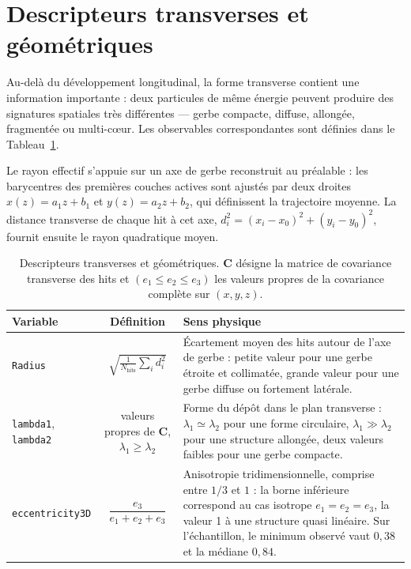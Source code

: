 \section{Descripteurs transverses et géométriques}
\label{annexe:transverse}

Au-delà du développement longitudinal, la forme transverse contient une information importante : deux particules de même énergie peuvent produire des signatures spatiales très différentes — gerbe compacte, diffuse, allongée, fragmentée ou multi-cœur. Les observables correspondantes sont définies dans le Tableau~\ref{tab:annexeA-transverse}.

Le rayon effectif s'appuie sur un axe de gerbe reconstruit au préalable : les barycentres des premières couches actives sont ajustés par deux droites \(x(z)=a_1 z+b_1\) et \(y(z)=a_2 z+b_2\), qui définissent la trajectoire moyenne. La distance transverse de chaque hit à cet axe, \(d_i^2=(x_i-x_0)^2+(y_i-y_0)^2\), fournit ensuite le rayon quadratique moyen.

\begin{table}[!ht]
    \centering
    \caption{Descripteurs transverses et géométriques. \(\mathbf{C}\) désigne la matrice de
             covariance transverse des hits et \((e_1 \le e_2 \le e_3)\) les valeurs propres de la
             covariance complète sur \((x,y,z)\).}
    \label{tab:annexeA-transverse}
    \small
    \begin{tabularx}{\textwidth}{@{}l c X@{}}
        \toprule
        \textbf{Variable} & \textbf{Définition} & \textbf{Sens physique} \\
        \midrule
        \texttt{Radius}
            & \(\sqrt{\tfrac{1}{N_{\mathrm{hits}}}\sum_i d_i^2}\)
            & Écartement moyen des hits autour de l'axe de gerbe : petite valeur pour une gerbe
              étroite et collimatée, grande valeur pour une gerbe diffuse ou fortement
              latérale. \\[4pt]
        \texttt{lambda1}, \texttt{lambda2}
            & valeurs propres de \(\mathbf{C}\), \(\lambda_1 \ge \lambda_2\)
            & Forme du dépôt dans le plan transverse : \(\lambda_1 \simeq \lambda_2\) pour une
              forme circulaire, \(\lambda_1 \gg \lambda_2\) pour une structure allongée, deux
              valeurs faibles pour une gerbe compacte. \\[4pt]
        \texttt{eccentricity3D}
            & \(\dfrac{e_3}{e_1+e_2+e_3}\)
            & Anisotropie tridimensionnelle, comprise entre \(1/3\) et \(1\) : la borne
              inférieure correspond au cas isotrope \(e_1 = e_2 = e_3\), la valeur 1 à une
              structure quasi linéaire. Sur l'échantillon, le minimum observé vaut \(0{,}38\)
              et la médiane \(0{,}84\). \\
        \bottomrule
    \end{tabularx}
\end{table}

